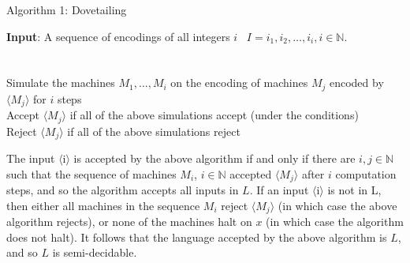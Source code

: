 \documentclass{csc_assignment}
\begin{document}
\begin{description}
\begin{enumerate}
\begin{enumerate}
\begin{minipage}{\linewidth}  
\begin{algorithm}[H]
\caption{Algorithm 1: Dovetailing}
\begin{algorithmic} 
\textbf{Input}: A sequence of encodings of all integers \langle $i$ \rangle \ $I = i_1, i_2,\ldots, i_i, i \in \mathbb{N}$. \\[1pt]
\\
\\ 
\STATE Simulate the machines $M_1, \ldots, M_i$ on the encoding of machines $M_j$ encoded by $\langle {M_{j}} \rangle$ for $i$ steps \\\STATE Accept $\langle {M_{j}} \rangle$ if all of the above simulations accept (under the conditions) \\
\STATE Reject $\langle {M_{j}} \rangle$ if all of the above simulations reject \\ 
\ENDFOR
\ENDFOR
\end{algorithmic}
\end{algorithm}
\end{minipage}
\vspace*{+0.5cm}

The input $\langle $i$ \rangle$ is accepted by the above algorithm if and only if there are $i, j \in \mathbb{N}$ such
that the sequence of machines $M_i$, $i \in \mathbb{N}$ accepted $\langle {M_{j}} \rangle$ after $i$ computation steps, and so the algorithm accepts all
inputs in $L$. If an input $\langle $i$ \rangle$ is not in L, then either all machines in the sequence
$M_i$ reject $\langle {M_{j}} \rangle$  (in which case the above algorithm rejects), or none of the machines halt on $x$ (in which case the algorithm does not halt). It follows that the language accepted by the above
algorithm is $L$, and so $L$ is semi-decidable.\\


\end{enumerate}
\end{enumerate}
\end{description}
\end{document}
